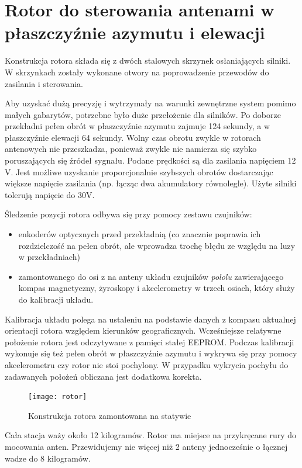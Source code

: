 \section{Rotor do sterowania antenami w płaszczyźnie azymutu i elewacji}

Konstrukcja rotora składa się z dwóch stalowych skrzynek osłaniających silniki. W skrzynkach zostały wykonane otwory na poprowadzenie przewodów do zasilania i sterowania.

Aby uzyskać dużą precyzję i wytrzymały na warunki zewnętrzne system pomimo małych gabarytów, potrzebne było duże przełożenie dla silników. Po doborze przekładni pełen obrót w płaszczyźnie azymutu zajmuje 124 sekundy, a w płaszczyźnie elewacji 64 sekundy. Wolny czas obrotu zwykle w rotorach antenowych nie przeszkadza, ponieważ zwykle nie namierza się szybko poruszających się źródeł sygnału. Podane prędkości są dla zasilania napięciem 12 V. Jest możliwe uzyskanie proporcjonalnie szybszych obrotów dostarczając większe napięcie zasilania (np. łącząc dwa akumulatory równolegle). Użyte silniki tolerują napięcie do 30V.

Śledzenie pozycji rotora odbywa się przy pomocy zestawu czujników: 
\begin{itemize}
 \item enkoderów optycznych przed przekładnią (co znacznie poprawia ich rozdzielczość na pełen obrót, ale wprowadza trochę błędu ze względu na luzy w przekładniach)
 \item zamontowanego do osi z na anteny układu czujników \emph{pololu} zawierającego kompas magnetyczny, żyroskopy i akcelerometry w trzech osiach, który służy do kalibracji układu.
\end{itemize}

Kalibracja układu polega na ustaleniu na podstawie danych z kompasu aktualnej orientacji rotora względem kierunków geograficznych. Wcześniejsze relatywne położenie rotora jest odczytywane z pamięci stałej EEPROM. Podczas kalibracji wykonuje się też pełen obrót w płaszczyźnie azymutu i wykrywa się przy pomocy akcelerometru czy rotor nie stoi pochylony. W przypadku wykrycia pochyłu do zadawanych położeń obliczana jest dodatkowa korekta.

\begin{figure}[!htbp]
 \texttt{[image: rotor]}
 \centering
 \caption{Konstrukcja rotora zamontowana na statywie}
\end{figure}

Cała stacja waży około 12 kilogramów. Rotor ma miejsce na przykręcane rury do mocowania anten. Przewidujemy nie więcej niż 2 anteny jednocześnie o łącznej wadze do 8 kilogramów.

